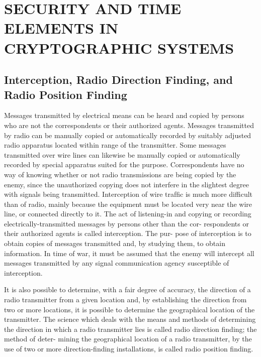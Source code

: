\section{SECURITY AND TIME ELEMENTS IN CRYPTOGRAPHIC SYSTEMS}

\subsection{Interception, Radio Direction Finding, and Radio Position Finding}

\mypara Messages transmitted by electrical means can be heard and copied
by persons who are not the correspondents or their authorized agents.
Messages transmitted by radio can be manually copied or automatically
recorded by suitably adjusted radio apparatus located within range of the
transmitter. Some messages transmitted over wire lines can likewise be
manually copied or automatically recorded by special apparatus suited
for the purpose. Correspondents have no way of knowing whether or not
radio transmissions are being copied by the enemy, since the unauthorized
copying does not interfere in the slightest degree with signals being
transmitted. Interception of wire trafﬁc is much more difficult than of
radio, mainly because the equipment must be located very near the wire
line, or connected directly to it. The act of listening-in and copying or
recording electrically-transmitted messages by persons other than the cor-
respondents or their authorized agents is called interception. The pur-
pose of interception is to obtain copies of messages transmitted and, by
studying them, to obtain information. In time of war, it must be assumed
that the enemy will intercept all messages transmitted by any signal
communication agency susceptible of interception.

\mypara It is also possible to determine, with a fair degree of accuracy, the
direction of a radio transmitter from a given location and, by establishing
the direction from two or more locations, it is possible to determine the
geographical location of the transmitter. The science which deals with
the means and methods of determining the direction in which a radio
transmitter lies is called radio direction ﬁnding; the method of deter-
mining the geographical location of a radio transmitter, by the use of
two or more direction-ﬁnding installations, is called radio position
ﬁnding.


